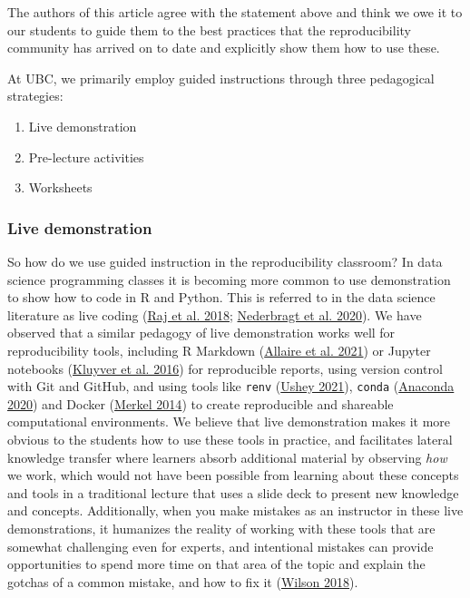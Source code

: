 \documentclass{article}
\begin{document}
The authors of this article agree with the statement above and think we
owe it to our students to guide them to the best practices that the
reproducibility community has arrived on to date and explicitly show
them how to use these.

At UBC, we primarily employ guided instructions through three
pedagogical strategies:

\begin{enumerate}
\def\labelenumi{\arabic{enumi}.}
\tightlist
\item
  Live demonstration
\item
  Pre-lecture activities
\item
  Worksheets
\end{enumerate}

\hypertarget{live-demonstration}{%
\subsubsection{Live demonstration}\label{live-demonstration}}

So how do we use guided instruction in the reproducibility classroom? In
data science programming classes it is becoming more common to use
demonstration to show how to code in R and Python. This is referred to
in the data science literature as live coding
(\protect\hyperlink{ref-raj2018role}{Raj et al. 2018};
\protect\hyperlink{ref-nederbragt2020ten}{Nederbragt et al. 2020}). We
have observed that a similar pedagogy of live demonstration works well
for reproducibility tools, including R Markdown
(\protect\hyperlink{ref-xie2021dynamic}{Allaire et al. 2021}) or Jupyter
notebooks (\protect\hyperlink{ref-kluyver2016jupyter}{Kluyver et al.
2016}) for reproducible reports, using version control with Git and
GitHub, and using tools like \texttt{renv}
(\protect\hyperlink{ref-kusheyrenv}{Ushey 2021}), \texttt{conda}
(\protect\hyperlink{ref-anaconda}{Anaconda 2020}) and Docker
(\protect\hyperlink{ref-merkel2014docker}{Merkel 2014}) to create
reproducible and shareable computational environments. We believe that
live demonstration makes it more obvious to the students how to use
these tools in practice, and facilitates lateral knowledge transfer
where learners absorb additional material by observing \emph{how} we
work, which would not have been possible from learning about these
concepts and tools in a traditional lecture that uses a slide deck to
present new knowledge and concepts. Additionally, when you make mistakes
as an instructor in these live demonstrations, it humanizes the reality
of working with these tools that are somewhat challenging even for
experts, and intentional mistakes can provide opportunities to spend
more time on that area of the topic and explain the gotchas of a common
mistake, and how to fix it
(\protect\hyperlink{ref-wilson_wilson_2018}{Wilson 2018}).
\end{document}
